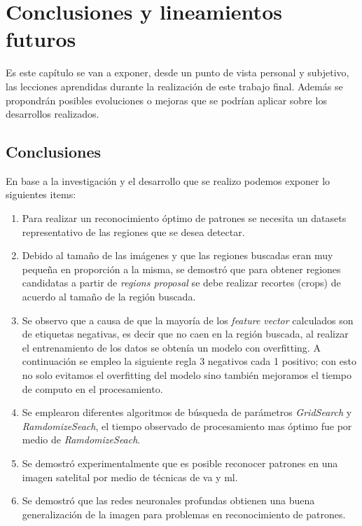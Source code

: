 \chapter{Conclusiones y lineamientos futuros}\label{chap:conclusiones}
Es este capítulo se van a exponer, desde un punto de vista personal y subjetivo, las lecciones aprendidas durante
la realización de este trabajo final. Además se propondrán posibles evoluciones o mejoras que se podrían aplicar sobre los
desarrollos realizados.

\section{Conclusiones}
En base a la investigación y el desarrollo que se realizo podemos exponer lo siguientes items:
\begin{enumerate}
\item Para realizar un reconocimiento óptimo de patrones se necesita un datasets representativo de las regiones que se desea detectar.
\item Debido al tamaño de las imágenes y que las regiones buscadas eran muy pequeña en proporción a la misma, se demostró que para obtener regiones candidatas a partir de \textit{regions proposal} se debe realizar recortes (crops) de acuerdo al tamaño de la región buscada.
\item Se observo que a causa de que  la mayoría de los \textit{feature vector} calculados son de etiquetas negativas, es decir que no caen en la 
región buscada, al realizar el entrenamiento de los datos se obtenía un modelo con overfitting. A continuación se empleo la siguiente regla 3 
negativos cada 1 positivo; con esto no solo evitamos el overfitting del modelo sino también mejoramos el tiempo de computo en el procesamiento. 
\item Se emplearon diferentes algoritmos de búsqueda de parámetros \textit{GridSearch} y \textit{RamdomizeSeach}, el tiempo observado de procesamiento mas óptimo fue por medio de \textit{RamdomizeSeach}.
\item Se demostró experimentalmente que es posible reconocer patrones en una imagen satelital por medio de técnicas de \ac{va} y \ac{ml}.
\item Se demostró que las redes neuronales profundas obtienen una buena generalización de la imagen para problemas en reconocimiento de patrones.
\end{enumerate}


